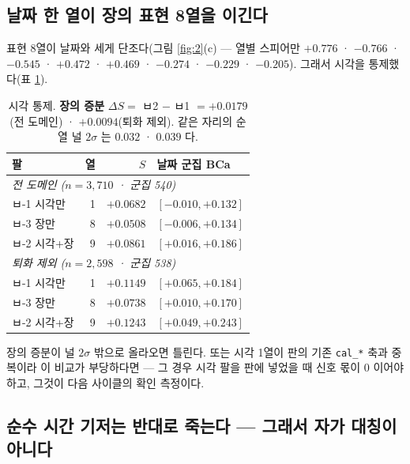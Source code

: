 \documentclass[10pt]{article}
\begin{document}
\subsection{날짜 한 열이 장의 표현 8열을 이긴다}

표현 8열이 날짜와 세게 단조다(그림 \ref{fig:2}(c) --- 열별 스피어만 $+0.776$ ·
$-0.766$ · $-0.545$ · $+0.472$ · $+0.469$ · $-0.274$ · $-0.229$ · $-0.205$).
그래서 시각을 통제했다(표 \ref{tab:partial}).

\begin{table}[h]\centering\tsize
\begin{tabular}{lrrl}
\toprule
팔 & 열 & $S$ & 날짜 군집 BCa \\
\midrule
\multicolumn{4}{l}{\emph{전 도메인 ($n=3{,}710$ · 군집 540)}}\\
ㅂ-1 시각만 & 1 & $+0.0682$ & $[-0.010,+0.132]$ \\
ㅂ-3 장만 & 8 & $+0.0508$ & $[-0.006,+0.134]$ \\
ㅂ-2 시각+장 & 9 & $+0.0861$ & $[+0.016,+0.186]$ \\
\midrule
\multicolumn{4}{l}{\emph{퇴화 제외 ($n=2{,}598$ · 군집 538)}}\\
ㅂ-1 시각만 & 1 & $\mathbf{+0.1149}$ & $[+0.065,+0.184]$ \\
ㅂ-3 장만 & 8 & $+0.0738$ & $[+0.010,+0.170]$ \\
ㅂ-2 시각+장 & 9 & $+0.1243$ & $[+0.049,+0.243]$ \\
\bottomrule
\end{tabular}
\caption{시각 통제. \textbf{장의 증분} $\Delta S = $ ㅂ2 $-$ ㅂ1 $=
\mathbf{+0.0179}$(전 도메인) · $\mathbf{+0.0094}$(퇴화 제외). 같은 자리의
순열 널 $2\sigma$ 는 $0.032$ · $0.039$ 다.}
\label{tab:partial}
\end{table}

{장의 증분이 널 $2\sigma$ 밖으로 올라오면 틀린다. 또는 시각 1열이 판의 기존
\texttt{cal\_*} 축과 중복이라 이 비교가 부당하다면 --- 그 경우 시각 팔을 판에
넣었을 때 신호 몫이 0 이어야 하고, 그것이 다음 사이클의 확인 측정이다.}

\subsection{순수 시간 기저는 반대로 죽는다 --- 그래서 자가 대칭이 아니다}
\end{document}
